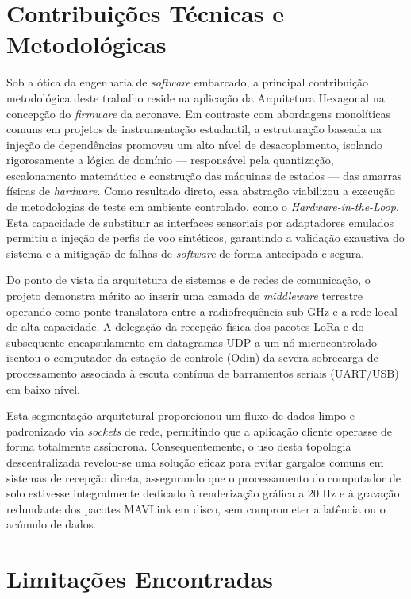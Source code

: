 \section{Contribuições Técnicas e Metodológicas}

Sob a ótica da engenharia de \textit{software} embarcado, a principal contribuição metodológica deste trabalho reside na aplicação da Arquitetura Hexagonal  na concepção do \textit{firmware} da aeronave. Em contraste com abordagens monolíticas comuns em projetos de instrumentação estudantil, a estruturação baseada na injeção de dependências promoveu um alto nível de desacoplamento, isolando rigorosamente a lógica de domínio — responsável pela quantização, escalonamento matemático e construção das máquinas de estados — das amarras físicas de \textit{hardware}. Como resultado direto, essa abstração viabilizou a execução de metodologias de teste em ambiente controlado, como o \textit{Hardware-in-the-Loop}. Esta capacidade de substituir as interfaces sensoriais por adaptadores emulados permitiu a injeção de perfis de voo sintéticos, garantindo a validação exaustiva do sistema e a mitigação de falhas de \textit{software} de forma antecipada e segura.

Do ponto de vista da arquitetura de sistemas e de redes de comunicação, o projeto demonstra mérito ao inserir uma camada de \textit{middleware} terrestre operando como ponte translatora entre a radiofrequência sub-GHz e a rede local de alta capacidade. A delegação da recepção física dos pacotes LoRa e do subsequente encapsulamento em datagramas UDP a um nó microcontrolado isentou o computador da estação de controle (Odin) da severa sobrecarga de processamento associada à escuta contínua de barramentos seriais (UART/USB) em baixo nível.

Esta segmentação arquitetural proporcionou um fluxo de dados limpo e padronizado via \textit{sockets} de rede, permitindo que a aplicação cliente operasse de forma totalmente assíncrona. Consequentemente, o uso desta topologia descentralizada revelou-se uma solução eficaz para evitar gargalos comuns em sistemas de recepção direta, assegurando que o processamento do computador de solo estivesse integralmente dedicado à renderização gráfica a 20 Hz e à gravação redundante dos pacotes MAVLink em disco, sem comprometer a latência ou o acúmulo de dados.


\section{Limitações Encontradas}

